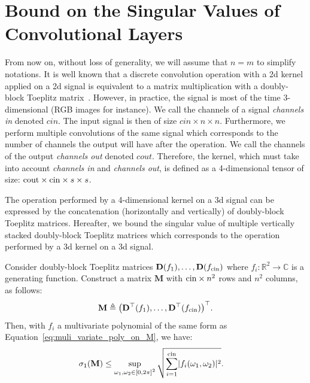 \section{Bound on the Singular Values of Convolutional Layers}\label{sec:bound_lipschitz_cst_conv}

From now on, without loss of generality, we will assume that $n=m$ to simplify notations.
It is well known that a discrete convolution operation with a 2d kernel applied on a 2d signal is equivalent to a matrix multiplication with a doubly-block Toeplitz matrix~\cite{jain1989fundamentals}.
However, in practice, the signal is most of the time 3-dimensional (RGB images for instance).
We call the channels of a signal {\em channels in} denoted $cin$.
The input signal is then of size $cin \times n \times n$.
Furthermore, we perform multiple convolutions of the same signal which corresponds to the number of channels the output will have after the operation.
We call the channels of the output {\em channels out} denoted $cout$.
Therefore, the kernel, which must take into account {\em channels in} and {\em channels out}, is defined as a 4-dimensional tensor of size: $\mathrm{cout} \times \mathrm{cin} \times s \times s$. 

The operation performed by a 4-dimensional kernel on a 3d signal can be expressed by the concatenation (horizontally and vertically) of doubly-block Toeplitz matrices.
Hereafter, we bound the singular value of multiple vertically stacked doubly-block Toeplitz matrices which corresponds to the operation performed by a 3d kernel on a 3d signal.

\begin{theorem} \label{th:theorem4} 
Consider doubly-block Toeplitz matrices $\mathbf{D}(f_1), \dots, \mathbf{D}(f_{\mathrm{cin}})$ where $f_i: \mathbb{R}^2 \rightarrow \mathbb{C}$ is a generating function.
Construct a matrix $\mathbf{M}$ with $\mathrm{cin}\times n^2$ rows and $n^2$ columns, as follows:
\begin{equation}
  \mathbf{M} \triangleq \leftmat \mathbf{D}^\top(f_1), \dots, \mathbf{D}^\top(f_{\cin}) \rightmat^\top .
\end{equation}
Then, with $f_i$ a multivariate polynomial of the same form as Equation~\ref{eq:muli_variate_poly_on_M}, we have:
\begin{align} \label{eq:bound_asymptotic_equiv}
  \sigma_1 \left( \mathbf{M} \right) &\leq \sup_{\omega_1, \omega_2 \in \left[0, 2\pi\right]^2} \sqrt{ \sum_{i=1}^{\cin} \left|f_i\right (\omega_1, \omega_2)|^2} .
\end{align}
\end{theorem}

